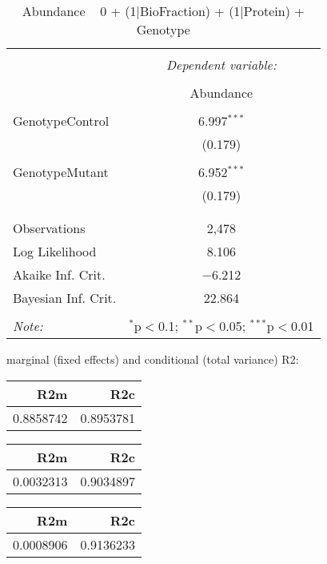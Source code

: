 \documentclass[11pt]{report}
\begin{document}
\begin{table}[!htbp] \centering 
  \caption{Abundance ~ 0 + (1|BioFraction) + (1|Protein) + Genotype} 
  \label{} 
\begin{tabular}{@{\extracolsep{5pt}}lc} 
\\[-1.8ex]\hline 
\hline \\[-1.8ex] 
 & \multicolumn{1}{c}{\textit{Dependent variable:}} \\ 
\cline{2-2} 
\\[-1.8ex] & Abundance \\ 
\hline \\[-1.8ex] 
 GenotypeControl & 6.997$^{***}$ \\ 
  & (0.179) \\ 
  & \\ 
 GenotypeMutant & 6.952$^{***}$ \\ 
  & (0.179) \\ 
  & \\ 
\hline \\[-1.8ex] 
Observations & 2,478 \\ 
Log Likelihood & 8.106 \\ 
Akaike Inf. Crit. & $-$6.212 \\ 
Bayesian Inf. Crit. & 22.864 \\ 
\hline 
\hline \\[-1.8ex] 
\textit{Note:}  & \multicolumn{1}{r}{$^{*}$p$<$0.1; $^{**}$p$<$0.05; $^{***}$p$<$0.01} \\ 
\end{tabular} 
\end{table} 
marginal (fixed effects) and conditional (total variance) R2:

\begin{tabular}{r|r}
\hline
R2m & R2c\\
\hline
0.8858742 & 0.8953781\\
\hline
\end{tabular}

\begin{tabular}{r|r}
\hline
R2m & R2c\\
\hline
0.0032313 & 0.9034897\\
\hline
\end{tabular}

\begin{tabular}{r|r}
\hline
R2m & R2c\\
\hline
0.0008906 & 0.9136233\\
\hline
\end{tabular}
\end{document}
